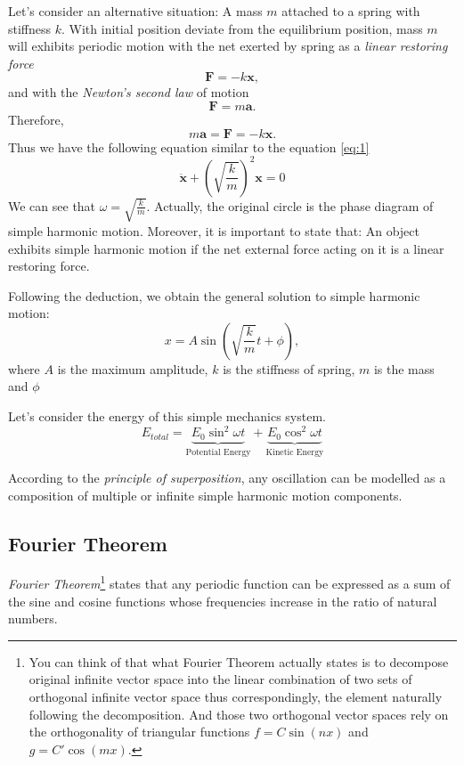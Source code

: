 \documentclass[openany]{book}
\begin{document}
Let's consider an alternative situation: A mass $m$ attached to a spring with stiffness $k$. With initial position deviate from the equilibrium position, mass $m$ will exhibits periodic motion with the net exerted by spring as a \emph{linear restoring force}
\[\mathbf{F}=-k\mathbf{x},\]
and with the \emph{Newton's second law} of motion
\[\mathbf{F}=m\mathbf{a}.\]
Therefore,
\[m\mathbf{a}=\mathbf{F}=-k\mathbf{x}.\]
Thus we have the following equation similar to the equation \eqref{eq:1}
\begin{equation}\label{eq:2}
\ddot{\mathbf{x}}+\left(\sqrt{\frac{k}{m}}\right)^2\mathbf{x}=0
\end{equation}
We can see that $\omega = \sqrt{\frac{k}{m}}$. Actually, the original circle is the phase diagram of simple harmonic motion. Moreover, it is important to state that: An object exhibits simple harmonic motion if the net external force acting on it is a linear restoring force.

Following the deduction, we obtain the general solution to simple harmonic motion:
\[x=A\sin \left(\sqrt{\frac{k}{m}}t+\phi \right),\]
where $A$ is the maximum amplitude, $k$ is the stiffness of spring, $m$ is the mass and $\phi $

Let's consider the energy of this simple mechanics system. 
\[
E_{total}=\underbrace{E_0\sin ^2\omega t}_\text{Potential Energy}+\underbrace{E_0\cos ^2\omega t}_\text{Kinetic Energy}
\]

According to the \emph{principle of superposition}, any oscillation can be modelled as a composition of multiple or infinite simple harmonic motion components.
\subsection{Fourier Theorem}
\emph{Fourier Theorem}\footnote{You can think of that what Fourier Theorem actually states is to decompose original infinite vector space into the linear combination of two sets of orthogonal infinite vector space thus correspondingly, the element naturally following the decomposition. And those two orthogonal vector spaces rely on the orthogonality of triangular functions $f=C\sin (nx)$ and $g=C'\cos (mx)$.} states that any periodic function can be expressed as a sum of the sine and cosine functions whose frequencies increase in the ratio of natural numbers.
\end{document}
